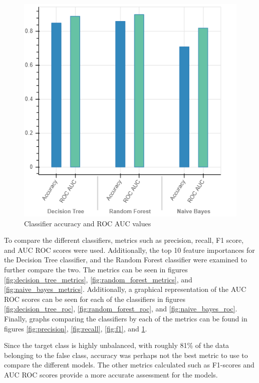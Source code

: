 \documentclass[10pt, conference, compsocconf]{IEEEtran}
\begin{document}
\begin{figure}
  \includegraphics[scale=0.45]{acc_roc}
  \centering
  \caption{Classifier accuracy and ROC AUC values}
  \label{fig:acc_roc}
\end{figure}

To compare the different classifiers, metrics such as precision, recall, F1 score, and AUC ROC scores were used. Additionally, the top 10 feature importances for the Decision Tree classifier, and the Random Forest classifier were examined to further compare the two. The metrics can be seen in figures \ref{fig:decision_tree_metrics}, \ref{fig:random_forest_metrics}, and \ref{fig:naive_bayes_metrics}. Additionally, a graphical representation of the AUC ROC scores can be seen for each of the classifiers in figures \ref{fig:decision_tree_roc}, \ref{fig:random_forest_roc}, and \ref{fig:naive_bayes_roc}. Finally, graphs comparing the classifiers by each of the metrics can be found in figures \ref{fig:precision}, \ref{fig:recall}, \ref{fig:f1}, and \ref{fig:acc_roc}.

Since the target class is highly unbalanced, with roughly 81\% of the data belonging to the false class, accuracy was perhaps not the best metric to use to compare the different models. The other metrics calculated such as F1-scores and AUC ROC scores provide a more accurate assessment for the models.
\end{document}
